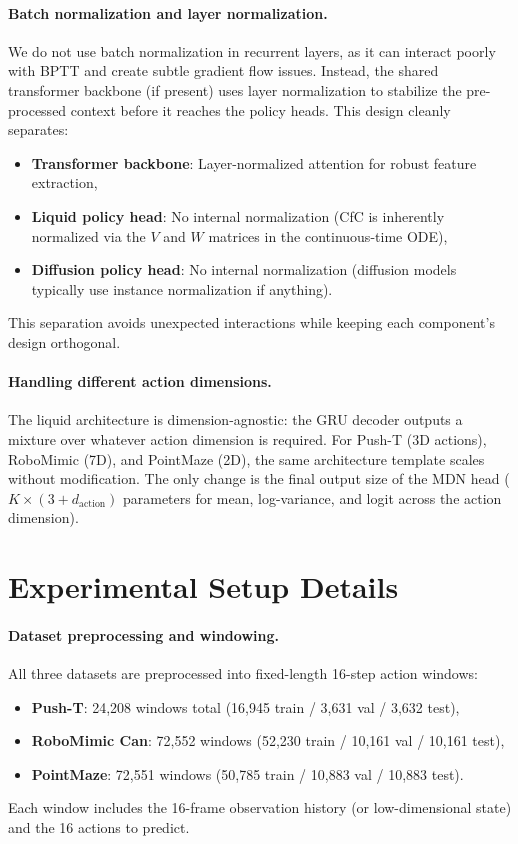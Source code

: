 \documentclass{article}
\begin{document}
\paragraph{Batch normalization and layer normalization.}
We do not use batch normalization in recurrent layers, as it can interact poorly with BPTT and create subtle gradient flow issues. Instead, the shared transformer backbone (if present) uses layer normalization to stabilize the pre-processed context before it reaches the policy heads. This design cleanly separates:
\begin{itemize}
    \item \textbf{Transformer backbone}: Layer-normalized attention for robust feature extraction,
    \item \textbf{Liquid policy head}: No internal normalization (CfC is inherently normalized via the $V$ and $W$ matrices in the continuous-time ODE),
    \item \textbf{Diffusion policy head}: No internal normalization (diffusion models typically use instance normalization if anything).
\end{itemize}
This separation avoids unexpected interactions while keeping each component's design orthogonal.

\paragraph{Handling different action dimensions.}
The liquid architecture is dimension-agnostic: the GRU decoder outputs a mixture over whatever action dimension is required. For Push-T (3D actions), RoboMimic (7D), and PointMaze (2D), the same architecture template scales without modification. The only change is the final output size of the MDN head ($K \times (3 + d_{\mathrm{action}})$ parameters for mean, log-variance, and logit across the action dimension).

\section{Experimental Setup Details}

\paragraph{Dataset preprocessing and windowing.}
All three datasets are preprocessed into fixed-length 16-step action windows:
\begin{itemize}
    \item \textbf{Push-T}: 24,208 windows total (16,945 train / 3,631 val / 3,632 test),
    \item \textbf{RoboMimic Can}: 72,552 windows (52,230 train / 10,161 val / 10,161 test),
    \item \textbf{PointMaze}: 72,551 windows (50,785 train / 10,883 val / 10,883 test).
\end{itemize}
Each window includes the 16-frame observation history (or low-dimensional state) and the 16 actions to predict.
\end{document}
